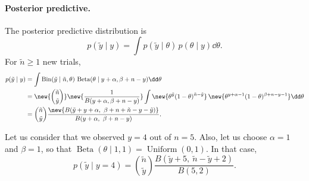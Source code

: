 \paragraph{Posterior predictive.}
The posterior predictive distribution is
\[
p(\tilde y \mid y) = \int p(\tilde y \mid \theta)\,p(\theta \mid y)\dd\theta.
\]
For $\tilde n \ge 1$ new trials,
\begin{align*}
p(\tilde y \mid y) &= \int \operatorname{Bin}(\tilde y \mid \tilde n, \theta)\,\operatorname{Beta}(\theta \mid y + \alpha, \beta + n - y)\dd\theta\\
&= \new{\binom{\tilde n}{\tilde y}}\new{\frac{1}{B(y+\alpha, \beta+n-y)}}\int \new{\theta^{\tilde y}(1-\theta)^{\tilde n - \tilde y}}\,\new{\theta^{y+\alpha-1}(1-\theta)^{\beta+n-y-1}}\dd\theta\\
&= \binom{\tilde n}{\tilde y}\frac{\new{B(\tilde y + y + \alpha,\ \beta + n + \tilde n - y - \tilde y)}}{B(y + \alpha,\ \beta + n - y)}.
\end{align*}

\begin{example}
Let us consider that we observed $y = 4$ out of $n = 5$. Also, let us choose $\alpha = 1$ and $\beta = 1$, so that $\operatorname{Beta}(\theta \mid 1, 1) = \operatorname{Uniform}(0,1)$. In that case,
\[
p(\tilde y \mid y = 4) = \binom{\tilde n}{\tilde y}\frac{B(\tilde y + 5,\ \tilde n - \tilde y + 2)}{B(5, 2)}.
\]
\end{example}


